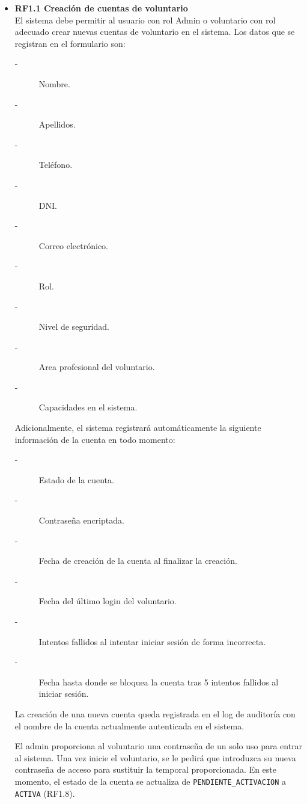 \begin{itemize}
    \item \textbf{RF1.1 Creación de cuentas de voluntario} \\
    El sistema debe permitir al usuario con rol Admin o voluntario con rol adecuado crear nuevas cuentas de voluntario en el sistema. 
    Los datos que se registran en el formulario son:
    \begin{description}
        \item[-] Nombre.
        \item[-] Apellidos.
        \item[-] Teléfono.
        \item[-] DNI. %
        \item[-] Correo electrónico.
        \item[-] Rol.
        \item[-] Nivel de seguridad.
        \item[-] Area profesional del voluntario. 
        \item[-] Capacidades en el sistema.
    \end{description}
    \par
    Adicionalmente, el sistema registrará automáticamente la siguiente información de la cuenta en todo momento:
    \begin{description}
        \item[-] Estado de la cuenta.
        \item[-] Contraseña encriptada.
        \item[-] Fecha de creación de la cuenta al finalizar la creación.
        \item[-] Fecha del último login del voluntario.
        \item[-] Intentos fallidos al intentar iniciar sesión de forma incorrecta.
        \item[-] Fecha hasta donde se bloquea la cuenta tras 5 intentos fallidos al iniciar sesión. 
    \end{description}
    \par
    La creación de una nueva cuenta queda registrada en el log de auditoría con el nombre de la cuenta actualmente autenticada en el sistema. 
    \par
    El admin proporciona al voluntario una contraseña de un solo uso para entrar al sistema. Una vez inicie el voluntario, se le pedirá que introduzca 
    su nueva contraseña de acceso para sustituir la temporal proporcionada. En este momento, el estado de la cuenta se actualiza de \texttt{PENDIENTE\_ACTIVACION} a 
    \texttt{ACTIVA} (RF1.8).
    

\end{itemize}
